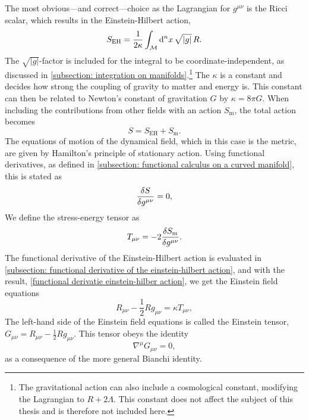 The most obvious---and correct---choice as the Lagrangian for $g^{\mu \nu}$ is the Ricci scalar, which results in the Einstein-Hilbert action,
%
\begin{equation}
    \label{Einstein-Hilbert action}
    S_{\text{EH}} = \frac{1}{2\kappa}\int_{\mathcal{M}} \dd^n x \, \sqrt{|g|}\, R.
\end{equation}
%
The $\sqrt{|g|}$-factor is included for the integral to be coordinate-independent, as discussed in  \autoref{subsection: integration on manifolds}.\footnote{The gravitational action can also include a cosmological constant, modifying the Lagrangian to $R + 2 \Lambda$. This constant does not affect the subject of this thesis and is therefore not included here.}
The $\kappa$ is a constant and decides how strong the coupling of gravity to matter and energy is.
This constant can then be related to Newton's constant of gravitation $G$ by $\kappa = 8 \pi G$.
When including the contributions from other fields with an action $S_\text{m}$, the total action becomes 
%
\begin{equation}
    S = S_\text{EH} + S_\text{m}.
\end{equation}
%
The equations of motion of the dynamical field, which in this case is the metric, are given by Hamilton's principle of stationary action.
Using functional derivatives, as defined in \autoref{subsection: functional calculus on a curved manifold}, this is stated as
%
\begin{equation}
    \fdv{S}{g^{\mu\nu}} = 0,
\end{equation}
%
We define the stress-energy tensor as
%
\begin{equation}
    \label{definition stress energy densor}
    T_{\mu\nu} = - 2 \fdv{S_\text{m}}{g^{\mu \nu}}.
\end{equation}
%
The functional derivative of the Einstein-Hilbert action is evaluated in \autoref{subsection: functional derivative of the einstein-hilbert action}, and with the result, \autoref{functional derivatie einstein-hilber action}, we get the Einstein field equations
%
\begin{equation}
    \label{Einstein field equations}
    R_{\mu \nu} - \frac{1}{2} R g_{\mu \nu} = \kappa T_{\mu \nu},
\end{equation}
%
The left-hand side of the Einstein field equations is called the Einstein tensor, $G_{\mu \nu} = R_{\mu \nu} - \frac{1}{2} R g_{\mu \nu}$. This tensor obeys the identity
\begin{equation}
    \label{Einstein tensor bianchi identity}
    \nabla^\mu G_{\mu \nu} = 0,
\end{equation}
as a consequence of the more general Bianchi identity.


